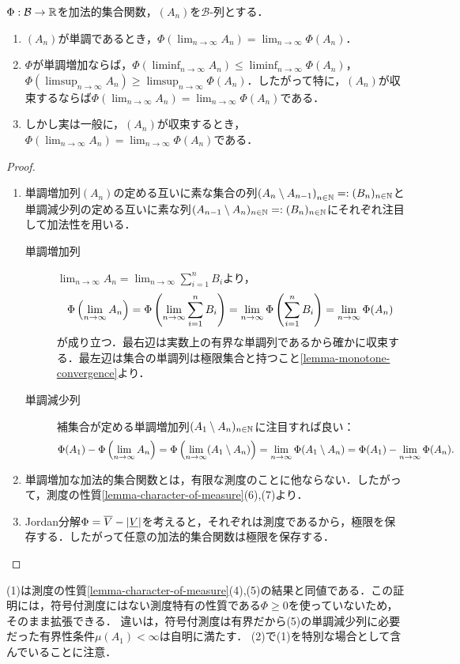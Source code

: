 \documentclass[uplatex, dvipdfmx]{jsreport}
\renewcommand{\B}{\mathcal{B}}
\begin{document}
\begin{proposition}[極限の保存]\label{prop-limits-of-additive-set-function}
    $\Phi:\B\to\R$を加法的集合関数，$(A_n)$を$\B$-列とする．
    \begin{enumerate}
        \item $(A_n)$が単調であるとき，$\Phi(\lim_{n\to\infty}A_n)=\lim_{n\to\infty}\Phi(A_n)$．
        \item $\Phi$が単調増加ならば，$\Phi(\liminf_{n\to\infty}A_n)\le\liminf_{n\to\infty}\Phi(A_n)$，$\Phi(\limsup_{n\to\infty}A_n)\ge\limsup_{n\to\infty}\Phi(A_n)$．したがって特に，$(A_n)$が収束するならば$\Phi(\lim_{n\to\infty}A_n)=\lim_{n\to\infty}\Phi(A_n)$である．
        \item しかし実は一般に，$(A_n)$が収束するとき，$\Phi(\lim_{n\to\infty}A_n)=\lim_{n\to\infty}\Phi(A_n)$である．
    \end{enumerate}
\end{proposition}
\begin{proof}\mbox{}
    \begin{enumerate}
        \item 単調増加列$(A_n)$の定める互いに素な集合の列$\left(A_n\setminus A_{n-1}\right)_{n\in\mathbb{N}}=:(B_n)_{n\in\mathbb{N}}$と単調減少列の定める互いに素な列$(A_{n-1}\setminus A_{n})_{n\in\mathbb{N}}=:(B_n)_{n\in\mathbb{N}}$にそれぞれ注目して加法性を用いる．
        \begin{description}
            \item[単調増加列] $\lim_{n\to\infty}A_n=\lim_{n\to\infty}\sum^n_{i=1}B_i$より，
            \[\Phi\left(\lim_{n\to\infty}A_n\right)=\Phi\left(\lim_{n\to\infty}\sum^n_{i=1}B_i\right)=\lim_{n\to\infty}\Phi\left(\sum^n_{i=1}B_i\right)=\lim_{n\to\infty}\Phi(A_n)\]
            が成り立つ．最右辺は実数上の有界な単調列であるから確かに収束する．最左辺は集合の単調列は極限集合と持つこと\ref{lemma-monotone-convergence}より．
            \item[単調減少列] 
            補集合が定める単調増加列$(A_1\setminus A_n)_{n\in\mathbb{N}}$に注目すれば良い：
            \[\Phi(A_1)-\Phi\left(\lim_{n\to\infty}A_n\right)=\Phi\left(\lim_{n\to\infty}(A_1\setminus A_n)\right)=\lim_{n\to\infty}\Phi(A_1\setminus A_n)=\Phi(A_1)-\lim_{n\to\infty}\Phi(A_n).\]
        \end{description}
        \item 単調増加な加法的集合関数とは，有限な測度のことに他ならない．したがって，測度の性質\ref{lemma-character-of-measure}(6),(7)より．
        \item Jordan分解$\Phi=\overline{V}-\lvert\underline{V}\rvert$を考えると，それぞれは測度であるから，極限を保存する．したがって任意の加法的集合関数は極限を保存する．
    \end{enumerate}
\end{proof}
\begin{remarks}
    (1)は測度の性質\ref{lemma-character-of-measure}(4),(5)の結果と同値である．この証明には，符号付測度にはない測度特有の性質である$\Phi\ge 0$を使っていないため，そのまま拡張できる．
    違いは，符号付測度は有界だから(5)の単調減少列に必要だった有界性条件$\mu(A_1)<\infty$は自明に満たす．
    (2)で(1)を特別な場合として含んでいることに注意．
\end{remarks}
\end{document}
